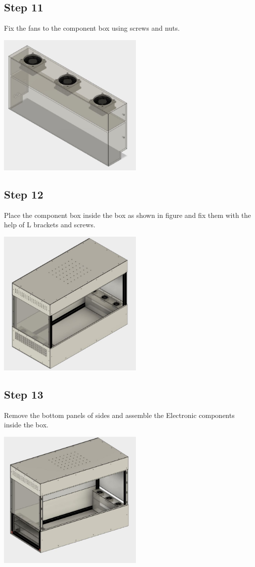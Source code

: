 \documentclass[a4paper,12pt,oneside]{book}
\begin{document}
\subsection*{Step 11}
Fix the fans to the component box using screws and nuts.\\
\begin{center}
 \includegraphics[width=200pt]{11} 
  \end{center}
\subsection*{Step 12}
Place the component box inside the box as shown in figure and fix them with the help of L brackets and screws.\\
\begin{center}
 \includegraphics[width=200pt]{12} 
  \end{center}
\subsection*{Step 13}
Remove the bottom panels of sides and assemble the Electronic components inside the box. \\
\begin{center}
  \includegraphics[width=200pt]{13}
  \end{center}
\end{document}
